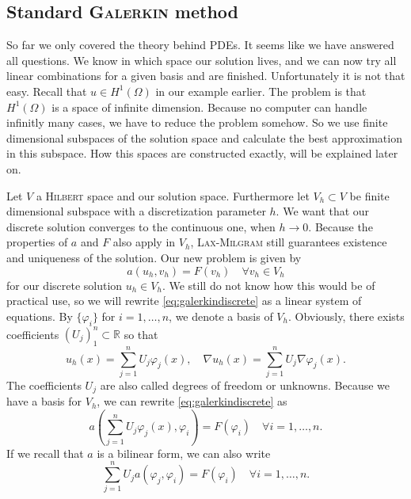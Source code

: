 \documentclass[12pt,a4paper,twoside, open=right]{scrreprt}
\theoremstyle{definition}
\theoremstyle{plain}
\newcommand{\rr}{\mathbb{R}}
\begin{document}
\subsection{Standard \textsc{Galerkin} method}
So far we only covered the theory behind PDEs. It seems like we have answered all questions. We know in which space our solution lives, and we can now try all linear combinations for a given basis and are finished. Unfortunately it is not that easy. Recall that $u\in H^1(\Omega)$ in our example earlier. The problem is that $H^1(\Omega)$ is a space of infinite dimension. Because no computer can handle infinitly many cases, we have to reduce the problem somehow. So we use finite dimensional subspaces of the solution space and calculate the best approximation in this subspace. How this spaces are constructed exactly, will be explained later on. 
\par 
Let $V$ a \textsc{Hilbert} space and our solution space. Furthermore let $V_h\subset V$ be finite dimensional subspace with a discretization parameter $h$. We want that our discrete solution converges to the continuous one, when $h\to 0$. Because the properties of $a$ and $F$ also apply in $V_h$, \textsc{Lax-Milgram} still guarantees existence and uniqueness of the solution. Our new problem is given by
\begin{equation}
    a(u_h,v_h) = F(v_h) \quad \forall v_h\in V_h \label{eq:galerkindiscrete}
\end{equation}
for our discrete solution $u_h\in V_h$.
We still do not know how this would be of practical use, so we will rewrite \eqref{eq:galerkindiscrete} as a linear system of equations. By $\{\varphi_i\}$ for $i=1,\dotsc,n$, we denote a basis of $V_h$. Obviously, there exists coefficients $(U_j)_1^n\subset\rr$ so that
\begin{equation}
    u_h(x)=\sum_{j=1}^{n}U_j\varphi_j(x),\quad \nabla u_h(x)=\sum_{j=1}^{n}U_j\nabla\varphi_j(x).
\end{equation}
The coefficients $U_j$ are also called degrees of freedom or unknowns. Because we have a basis for $V_h$, we can rewrite \eqref{eq:galerkindiscrete} as 
\begin{equation}
    a\left(\sum_{j=1}^{n}U_j\varphi_j(x),\varphi_i\right)= F(\varphi_i)\quad \forall i=1,\dotsc,n.
\end{equation}
If we recall that $a$ is a bilinear form, we can also write
\begin{equation}
    \sum_{j=1}^{n}U_ja(\varphi_j,\varphi_i)=F(\varphi_i) \quad\forall i=1,\dotsc,n.
\end{equation}
\end{document}
